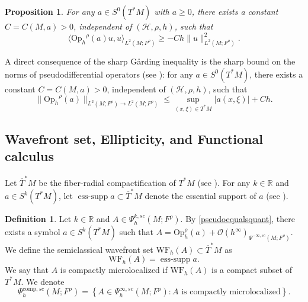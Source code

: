 \documentclass[11pt,oneside,reqno]{amsart}
\newcommand\R{\ensuremath{\mathbb{R}}}
\newcommand\Oph{\ensuremath{\mathrm{Op}_h}}
\newtheorem{proposition}[theorem]{Proposition}
\theoremstyle{definition}
\newtheorem{definition}{Definition}[section]
\numberwithin{equation}{section}
\theoremstyle{plain}
\begin{document}
\begin{proposition}\label{uniformsharpgarding}
    For any $a \in S^{0} (T^*M)$ with $a\geq 0$, there exists a constant $C=C(M,a)>0$, independent of $(\mathcal{H},\rho,h)$, such that 
    \begin{equation*}
        \langle \Oph^{\rho}(a)u,u\rangle_{L^2(M;F^\rho)}\geq -Ch \|u \|_{L^2(M;F^\rho)}^2.
    \end{equation*}
\end{proposition}

A direct consequence of the sharp Gårding inequality is the sharp bound on the norms of pseudodifferential operators (see \cite[Theorem 13.13]{zworski2012semiclassicalanalysis}): for any $a \in S^{0} (T^*M)$, there exists a constant $C=C(M,a)>0$, independent of $(\mathcal{H},\rho,h)$, such that
\begin{equation}\label{sharpnorm}
        \|\Oph^{\rho}(a)\|_{L^2(M;F^{\rho})\to L^2(M;F^{\rho})}\leq \sup_{(x,\xi)\in T^*M} |a(x,\xi)|+Ch.
\end{equation}



\subsection{Wavefront set, Ellipticity, and Functional calculus}

Let $\overline{T}^*M$ be the fiber-radial compactification of $T^*M$ (see \cite[Appendix E.1.3]{dyatlovzworski2019resonances}). For any $k\in \R$ and $a \in S^k(T^*M)$, let $\operatorname{ess-supp} a \subset \overline{T}^*M$ denote the essential support of $a$ (see \cite[Definition E.26]{dyatlovzworski2019resonances}).



\begin{definition}\label{wavefrontset}
Let $k\in \R$ and $A \in \Psi_h^{k,sc}(M;F^\rho)$. By \eqref{pseudoequalsquant}, there exists a symbol $a \in S^{k} (T^*M)$ such that $A=\mathrm{Op}_h^{\rho}(a)+\mathcal{O} (h^{\infty} )_{\Psi^{-\infty,sc}(M;F^\rho)}$. We define the semiclassical wavefront set $\mathrm{WF}_h(A) \subset \overline{T}^* M$ as
\begin{equation*}
    \mathrm{WF}_{h}(A)=\operatorname{ess-supp} a.
\end{equation*}
We say that $A$ is compactly microlocalized if $\mathrm{WF}_h(A)$ is a compact subset of $T^* M$. We denote
\begin{equation*}
    \Psi_h^{\text{comp},sc}(M;F^\rho) = \left\{A \in  \Psi_h^{\infty,sc}(M;F^\rho): A \textrm{ is compactly microlocalized} \right\}.
\end{equation*}
\end{definition}
\end{document}
